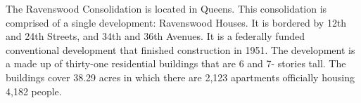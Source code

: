        

     

The Ravenswood Consolidation is located in Queens. This consolidation is comprised of a single development: Ravenswood Houses. It is bordered by 12th and 24th Streets, and 34th and 36th Avenues. It is a federally funded conventional development that finished construction in 1951. The development is a made up of thirty-one residential buildings that are 6 and 7- stories tall. The buildings cover 38.29 acres in which there are 2,123 apartments officially housing 4,182 people.   

 